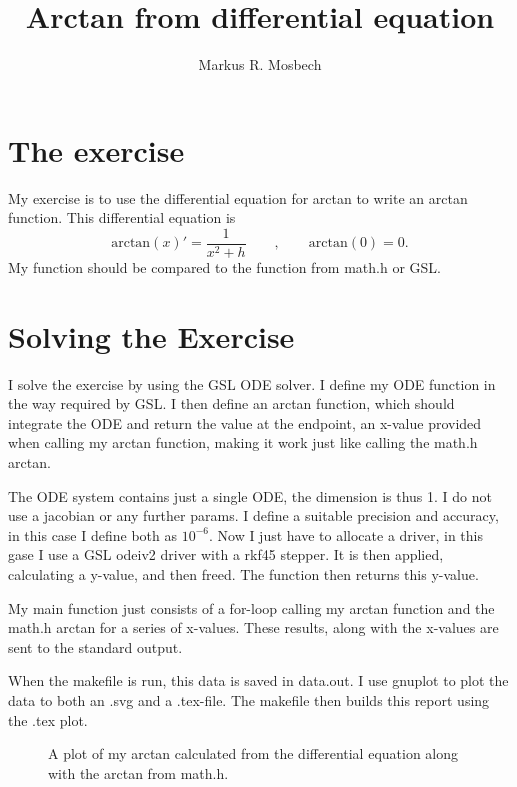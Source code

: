 \documentclass[a4paper]{article}
\title{Arctan from differential equation}
\author{Markus R. Mosbech}
\date{}
\begin{document}
\maketitle


\section{The exercise}
My exercise is to use the differential equation for arctan to write an arctan function.
This differential equation is
\begin{equation}
  \text{arctan}(x)' = \frac{1}{x^2 + h} \qquad , \qquad \text{arctan}(0)=0.
\end{equation}
My function should be compared to the function from math.h or GSL.

\section{Solving the Exercise}
I solve the exercise by using the GSL ODE solver. I define my ODE function in the
way required by GSL.
I then define an arctan function, which should integrate the ODE and return the
value at the endpoint, an x-value provided when calling my arctan function,
making it work just like calling the math.h arctan.

The ODE system contains just a single ODE, the dimension is thus 1. I do not use a jacobian or any further params.
I define a suitable precision and accuracy, in this case I define both as $10^{-6}$.
Now I just have to allocate a driver, in this gase I use a GSL odeiv2 driver with a
rkf45 stepper. It is then applied, calculating a y-value, and then freed. The function
then returns this y-value.

My main function just consists of a for-loop calling my arctan function and the math.h arctan
for a series of x-values. These results, along with the x-values are sent to the standard output.

When the makefile is run, this data is saved in data.out. I use gnuplot to plot the data to both
an .svg and a .tex-file. The makefile then builds this report using the .tex plot.



\begin{figure}
  
  \caption{A plot of my arctan calculated from the differential equation along with the arctan from math.h.}
  \label{fig:erf}
\end{figure}
\end{document}
